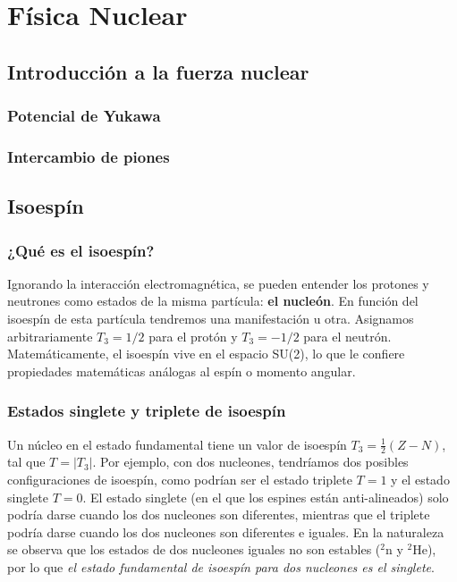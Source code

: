 \chapter{Física Nuclear}

\section{Introducción a la fuerza nuclear}

\subsection{Potencial de Yukawa}

\subsection{Intercambio de piones}

\section{Isoespín}

\subsection{¿Qué es el isoespín?}

Ignorando la interacción electromagnética, se pueden entender los protones y neutrones como estados de la misma partícula: \textbf{el nucleón}. En función del isoespín de esta partícula tendremos una manifestación u otra. Asignamos arbitrariamente $T_3=1/2$ para el protón y $T_3=-1/2$ para el neutrón. Matemáticamente, el isoespín vive en el espacio SU(2), lo que le confiere propiedades matemáticas análogas al espín o momento angular.

\subsection{Estados singlete y triplete de isoespín}

Un núcleo en el estado fundamental tiene un valor de isoespín $T_3=\frac{1}{2} (Z-N)$, tal que $T=|T_3|$. Por ejemplo, con dos nucleones, tendríamos dos posibles configuraciones de isoespín, como podrían ser el estado triplete $T=1$ y el estado singlete $T=0$. El estado singlete (en el que los espines están anti-alineados) solo podría darse cuando los dos nucleones son diferentes, mientras que el triplete podría darse cuando los dos nucleones son diferentes e iguales. En la naturaleza se observa que los estados de dos nucleones iguales no son estables ($^2$n y $^2$He), por lo que \textit{el estado fundamental de isoespín para dos nucleones es el singlete}.  

